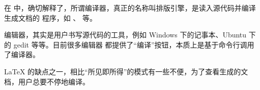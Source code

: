%
%
%
%
%
%
%


在  中，确切解释了，所谓编译器，真正的名称叫排版引擎，是读入源代码并编译生成文档的
程序，如 \pdfTeX{}、\XeTeX{} 等。

编辑器，其实是用户书写源代码的工具，例如 Windows 下的记事本、Ubuntu 下的 gedit 等等。目前很多编辑器
都提供了“编译”按钮，本质上是基于命令行调用了编译器。


\LaTeX{} 的缺点之一，相比“所见即所得”的模式有一些不便，为了查看生成的文档，用户总要不停地编译。  

